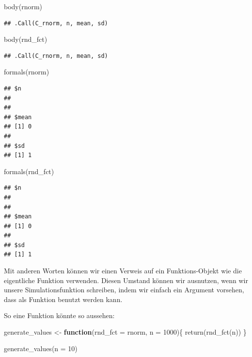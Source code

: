 \documentclass[
]{book}
\newenvironment{Shaded}{\begin{snugshade}}{\end{snugshade}}
\newcommand{\AttributeTok}[1]{\textcolor[rgb]{0.77,0.63,0.00}{#1}}
\newcommand{\ControlFlowTok}[1]{\textcolor[rgb]{0.13,0.29,0.53}{\textbf{#1}}}
\newcommand{\DecValTok}[1]{\textcolor[rgb]{0.00,0.00,0.81}{#1}}
\newcommand{\FunctionTok}[1]{\textcolor[rgb]{0.00,0.00,0.00}{#1}}
\newcommand{\NormalTok}[1]{#1}
\newcommand{\OtherTok}[1]{\textcolor[rgb]{0.56,0.35,0.01}{#1}}
\begin{document}
\begin{Shaded}
\begin{Highlighting}[]
\FunctionTok{body}\NormalTok{(rnorm)}
\end{Highlighting}
\end{Shaded}

\begin{verbatim}
## .Call(C_rnorm, n, mean, sd)
\end{verbatim}

\begin{Shaded}
\begin{Highlighting}[]
\FunctionTok{body}\NormalTok{(rnd\_fct)}
\end{Highlighting}
\end{Shaded}

\begin{verbatim}
## .Call(C_rnorm, n, mean, sd)
\end{verbatim}

\begin{Shaded}
\begin{Highlighting}[]
\FunctionTok{formals}\NormalTok{(rnorm)}
\end{Highlighting}
\end{Shaded}

\begin{verbatim}
## $n
## 
## 
## $mean
## [1] 0
## 
## $sd
## [1] 1
\end{verbatim}

\begin{Shaded}
\begin{Highlighting}[]
\FunctionTok{formals}\NormalTok{(rnd\_fct)}
\end{Highlighting}
\end{Shaded}

\begin{verbatim}
## $n
## 
## 
## $mean
## [1] 0
## 
## $sd
## [1] 1
\end{verbatim}

Mit anderen Worten können wir einen Verweis auf ein Funktions-Objekt wie die eigentliche Funktion verwenden. Diesen Umstand können wir ausnutzen, wenn wir unsere Simulationsfunktion schreiben, indem wir einfach ein Argument vorsehen, dass als Funktion benutzt werden kann.

So eine Funktion könnte so aussehen:

\begin{Shaded}
\begin{Highlighting}[]
\NormalTok{generate\_values }\OtherTok{\textless{}{-}} \ControlFlowTok{function}\NormalTok{(}\AttributeTok{rnd\_fct =}\NormalTok{ rnorm,}
                            \AttributeTok{n =} \DecValTok{1000}\NormalTok{)\{}
  \FunctionTok{return}\NormalTok{(}\FunctionTok{rnd\_fct}\NormalTok{(n))}
\NormalTok{\}}

\FunctionTok{generate\_values}\NormalTok{(}\AttributeTok{n =} \DecValTok{10}\NormalTok{)}
\end{Highlighting}
\end{Shaded}
\end{document}
